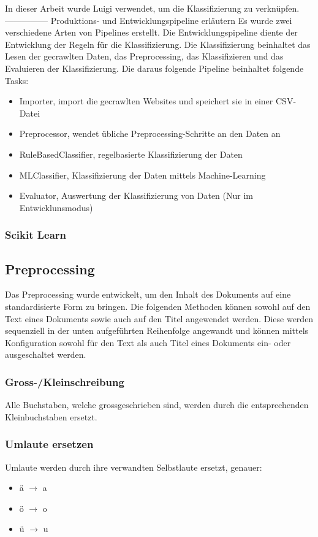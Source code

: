 In dieser Arbeit wurde Luigi verwendet, um die Klassifizierung zu verknüpfen.
--------------- Produktions- und Entwicklungspipeline erläutern
Es wurde zwei verschiedene Arten von Pipelines erstellt.
Die Entwicklungspipeline diente der Entwicklung der Regeln für die Klassifizierung.
Die Klassifizierung beinhaltet das Lesen der gecrawlten Daten, das Preprocessing, das Klassifizieren und das Evaluieren der Klassifizierung.
Die daraus folgende Pipeline beinhaltet folgende Tasks:
\begin{itemize}
	\item Importer, import die gecrawlten Websites und speichert sie in einer CSV-Datei
	\item Preprocessor, wendet übliche Preprocessing-Schritte an den Daten an
	\item RuleBasedClassifier, regelbasierte Klassifizierung der Daten 
	\item MLClassifier, Klassifizierung der Daten mittels Machine-Learning
	\item Evaluator, Auswertung der Klassifizierung von Daten (Nur im Entwicklunsmodus)
\end{itemize}
\subsubsection{Scikit Learn}
\subsection{Preprocessing}\label{preprocessing}
Das Preprocessing wurde entwickelt, um den Inhalt des Dokuments auf eine standardisierte Form zu bringen.
Die folgenden Methoden können sowohl auf den Text eines Dokuments sowie auch auf den Titel angewendet werden.
Diese werden sequenziell in der unten aufgeführten Reihenfolge angewandt und können mittels Konfiguration sowohl für den Text als auch Titel eines Dokuments ein- oder ausgeschaltet werden.
\subsubsection{Gross-/Kleinschreibung}
Alle Buchstaben, welche grossgeschrieben sind, werden durch die entsprechenden Kleinbuchstaben ersetzt.
\subsubsection{Umlaute ersetzen}
Umlaute werden durch ihre verwandten Selbstlaute ersetzt, genauer:
\begin{itemize}
	\item ä $\rightarrow$ a
	\item ö $\rightarrow$ o
	\item ü $\rightarrow$ u
\end{itemize} 
